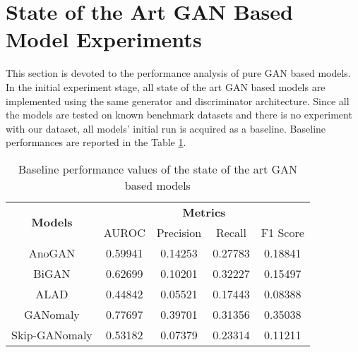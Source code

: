 \section{State of the Art GAN Based Model Experiments}
\label{sec:exp_pure_gan}
This section is devoted to the performance analysis of pure GAN based models. In the initial
experiment stage, all state of the art GAN based models are implemented using the same generator and
discriminator architecture. Since all the models are tested on known benchmark datasets and there is
no experiment with our dataset, all models' initial run is acquired as a baseline. Baseline
performances are reported in the Table \ref{tab:exp_baseline}.

\begin{longtable}[c]{|c|cccc|}
	\caption{Baseline performance values of the state of the art GAN based models}
	\label{tab:exp_baseline}\\
	\hline
	\multirow{2}{*}{\textbf{Models}} & \multicolumn{4}{c|}{\textbf{Metrics}} \\ \cline{2-5} 
	& AUROC & Precision & Recall & F1 Score \\ \hline
	\endhead
\multicolumn{1}{|c|}{AnoGAN} & \multicolumn{1}{c}{0.59941} & \multicolumn{1}{c}{0.14253} & \multicolumn{1}{c}{0.27783} & \multicolumn{1}{c|}{0.18841} \\ \hline
\multicolumn{1}{|c|}{BiGAN} & \multicolumn{1}{c}{0.62699} & \multicolumn{1}{c}{0.10201} & \multicolumn{1}{c}{0.32227} & \multicolumn{1}{c|}{0.15497} \\ \hline
\multicolumn{1}{|c|}{ALAD} & \multicolumn{1}{c}{0.44842} & \multicolumn{1}{c}{0.05521} & \multicolumn{1}{c}{0.17443} & \multicolumn{1}{c|}{0.08388} \\ \hline
\multicolumn{1}{|c|}{GANomaly} & \multicolumn{1}{c}{0.77697} & \multicolumn{1}{c}{0.39701} & \multicolumn{1}{c}{0.31356} & \multicolumn{1}{c|}{0.35038} \\ \hline
\multicolumn{1}{|c|}{Skip-GANomaly} & \multicolumn{1}{c}{0.53182} & \multicolumn{1}{c}{0.07379} & \multicolumn{1}{c}{0.23314} & \multicolumn{1}{c|}{0.11211} \\ \hline

\end{longtable}


